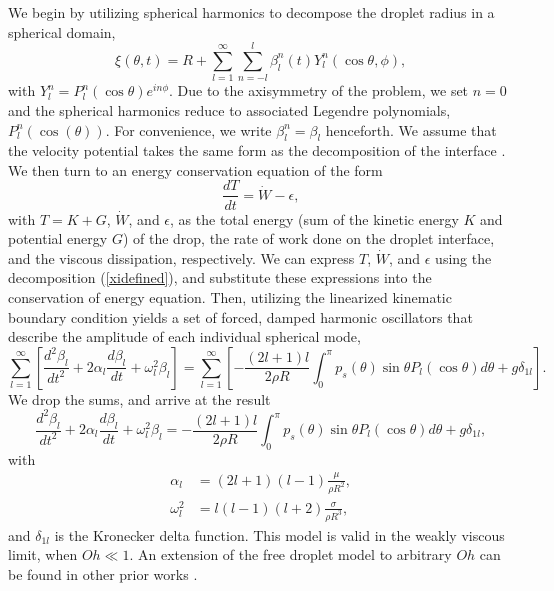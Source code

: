 \documentclass{jfm}
\begin{document}
We begin by utilizing spherical harmonics to decompose the droplet radius in a spherical domain, 
\begin{equation}
    \xi(\theta,t) = R + \sum_{l=1}^{\infty} \sum_{n=-l}^l \beta_l^n(t) Y_l^n(\cos{\theta},\phi) \text{,}
    \label{xidefined}
\end{equation}
with $Y_l^n =  P_l^n(\cos{\theta}) e^{i n \phi}$.
Due to the axisymmetry of the problem, we set $n=0$ and the spherical harmonics reduce to associated Legendre polynomials, $P_l^n (\cos(\theta))$. For convenience, we write $\beta_l^n=\beta_l$ henceforth. We assume that the velocity potential takes the same form as the decomposition of the interface \citep{lamb1924hydrodynamics, balla2019shape}.
We then turn to an energy conservation equation of the form
\begin{equation}
    \frac{d T}{dt} = \dot{W} - \epsilon \text{,}
\end{equation}
with $T = K + G$, $\dot{W}$, and $\epsilon$, as the total energy (sum of the kinetic energy $K$ and potential energy $G$) of the drop, the rate of work done on the droplet interface, and the viscous dissipation, respectively. We can express $T$, $\dot{W}$, and $\epsilon$ using the decomposition (\ref{xidefined}), and substitute these expressions into the conservation of energy equation. Then, utilizing the linearized kinematic boundary condition yields a set of forced, damped harmonic oscillators that describe the amplitude of each individual spherical mode,
\begin{equation}
     \sum_{l=1}^{\infty} \left[ \frac{d^2 \beta_l}{dt^2} + 2 \alpha_{l} \frac{d \beta_l}{dt} + \omega_{l}^2 \beta_l \right ] = \sum_{l=1}^{\infty} \left[ -\frac{(2l+1)l}{2\rho R} \int_0^{\pi} p_s(\theta) \sin{\theta} P_l(\cos{\theta}) d\theta + g \delta_{1l} \right ] \text{.}
\end{equation}
We drop the sums, and arrive at the result
\begin{equation}
     \frac{d^2 \beta_l}{dt^2} + 2 \alpha_{l} \frac{d \beta_l}{dt} + \omega_{l}^2 \beta_l = -\frac{(2l+1)l}{2\rho R} \int_0^{\pi} p_s(\theta) \sin{\theta} P_l(\cos{\theta}) d\theta + g \delta_{1l} \text{,}
    \label{dropmodeeq}
\end{equation}
with \begin{align}
    \alpha_{l} &= (2l+1)(l-1)\frac{\mu}{\rho R^2} \text{,}\\
    \omega_{l}^2 &= l(l-1)(l+2) \frac{\sigma}{\rho R^3} \text{,}
\end{align}
and $\delta_{1l}$ is the Kronecker delta function.  This model is valid in the weakly viscous limit, when $Oh\ll1$.
An extension of the free droplet model to arbitrary $Oh$ can be found in other prior works \citep{chandrasekhar2013hydrodynamic,molavcek2012quasi,miller1968oscillations}.
\end{document}

